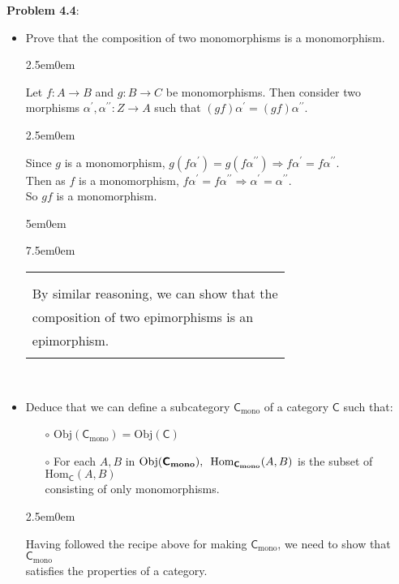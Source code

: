 \documentclass{book}
\newcommand{\pracTwo}{
   \color{Orange}%
   \fontsize{12}{14}\selectfont%
}
\newenvironment{myIndent}{%
   \begin{adjustwidth}{2.5em}{0em}%
}{%
   \end{adjustwidth}%
}
\newenvironment{myDindent}{%
   \begin{adjustwidth}{5em}{0em}%
}{%
   \end{adjustwidth}%
}
\newenvironment{myTindent}{%
   \begin{adjustwidth}{7.5em}{0em}%
}{%
   \end{adjustwidth}%
}
\newcommand{\pprime}{{\prime\prime}}
\newcommand{\myHS}{ \hspace{0.5em}}
\newcommand{\myObj}{\mathrm{Obj}}
\newcommand{\myHom}{\mathrm{Hom}}
\newcommand{\mcateg}[1]{{\bm{\mathsf{#1}}}}
\newenvironment{myClosureOne}[2][.]{%
   \color{#1}%
   \begin{tabular}{|p{#2in}|} \hline \\%
}{%
   \\ \hline \end{tabular}%
}
\newcommand{\retTwo}{\hfill\bigbreak}
\begin{document}
\textbf{Problem 4.4}:
\begin{itemize}
   \item Prove that the composition of two monomorphisms is a monomorphism.
   {\begin{myIndent}\pracTwo
      Let $f: A \longrightarrow B$ and $g: B \longrightarrow C$ be monomorphisms. Then consider two\\ morphisms $\alpha^\prime, \alpha^\pprime: Z \longrightarrow A$ such that $(gf)\alpha^\prime = (gf)\alpha^\pprime$.
      \begin{myIndent}
         Since $g$ is a monomorphism, $g(f\alpha^\prime) = g(f\alpha^\pprime) \Longrightarrow f\alpha^\prime = f\alpha^\pprime$.\\
         Then as $f$ is a monomorphism, $f\alpha^\prime = f\alpha^\pprime \Longrightarrow \alpha^\prime = \alpha^\pprime$.\\
         So $gf$ is a monomorphism.
      \end{myIndent}
      \begin{myDindent}\begin{myTindent}
         \begin{myClosureOne}{3.35}
            \\ [-22pt] By similar reasoning, we can show that the\\ composition of two epimorphisms is an\\ epimorphism.\\ [-10pt]
         \end{myClosureOne}\\
      \end{myTindent}\end{myDindent}
   \end{myIndent}}

   \item Deduce that we can define a subcategory $\mcateg{C}_{\mathrm{mono}}$ of a category $\mcateg{C}$ such that:
   \begin{itemize}
      \item[$\circ$] $\myObj(\mcateg{C_{\mathrm{mono}}}) = \myObj(\mcateg{C})$
      \item[$\circ$] For each $A, B$ in $\myObj(\mcateg{C_{\mathrm{mono}}}), \myHS \myHom_{\mcateg{C_{\mathrm{mono}}}}(A, B)$ is the subset of $\myHom_{\mcateg{C}}(A, B)$\\ consisting of only monomorphisms.
   \end{itemize}

   {\begin{myIndent}\pracTwo
      Having followed the recipe above for making $\mcateg{C}_{\mathrm{mono}}$, we need to show that $\mcateg{C}_{\mathrm{mono}}$\\ satisfies the properties of a category.\retTwo


\end{myIndent}}
\end{itemize}
\end{document}
